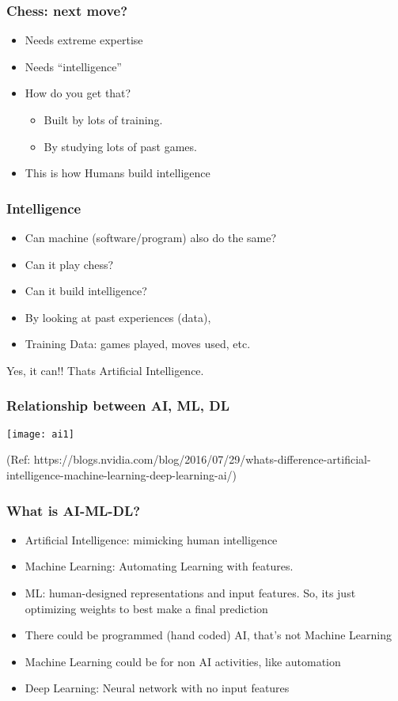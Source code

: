 \begin{frame}[fragile]\frametitle{Chess: next move?}
\begin{itemize}
\item Needs extreme expertise
\item Needs ``intelligence''
\item How do you get that?
\begin{itemize}
\item Built by lots of training.
\item By studying lots of past games.
\end{itemize}
\item This is how Humans build intelligence
\end{itemize}
\end{frame}

\begin{frame}[fragile]\frametitle{Intelligence}
\begin{itemize}
\item Can machine (software/program) also do the same?
\item Can it play chess?
\item Can it build intelligence?
\item By looking at past experiences (data), 
\item Training Data: games played, moves used, etc.
\end{itemize}
Yes, it can!! Thats Artificial Intelligence.
\end{frame}


\begin{frame}[fragile]\frametitle{Relationship between AI, ML, DL}
\begin{center}
\texttt{[image: ai1]}
\end{center}
{\tiny (Ref: https://blogs.nvidia.com/blog/2016/07/29/whats-difference-artificial-intelligence-machine-learning-deep-learning-ai/)}
\end{frame}

\begin{frame}[fragile] \frametitle{What is AI-ML-DL?}

\begin{itemize}
\item Artificial Intelligence: mimicking human intelligence
\item Machine Learning: Automating Learning with features. 
\item ML: human-designed representations and input features.  So, its just optimizing weights to best make a final prediction
\item There could be programmed (hand coded) AI, that's not Machine Learning
\item Machine Learning could be for non AI activities, like automation
\item Deep Learning: Neural network with no input features
\end{itemize}
\end{frame}


